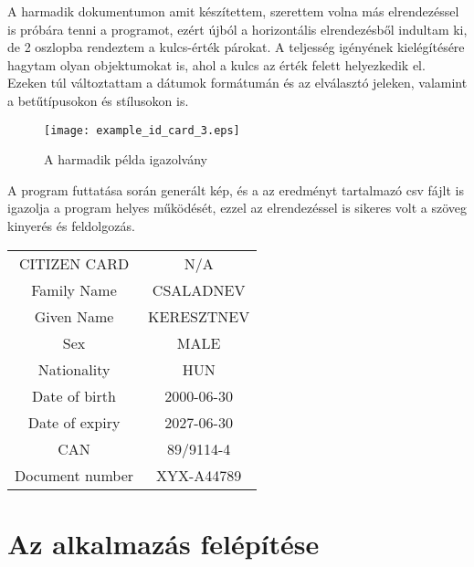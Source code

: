 \documentclass[12pt]{report}
\begin{document}
A harmadik dokumentumon amit készítettem, szerettem volna más elrendezéssel is próbára tenni a programot, ezért újból a horizontális elrendezésből indultam ki, de 2 oszlopba rendeztem a kulcs-érték párokat. A teljesség igényének kielégítésére hagytam olyan objektumokat is, ahol a kulcs az érték felett helyezkedik el. Ezeken túl változtattam a dátumok formátumán és az elválasztó jeleken, valamint a betűtípusokon és stílusokon is.

\begin{figure}[h]
    \centerline{\texttt{[image: example\_id\_card\_3.eps]}}
    \caption{A harmadik példa igazolvány}
\end{figure}

A program futtatása során generált kép, és a az eredményt tartalmazó csv fájlt is igazolja a program helyes működését, ezzel az elrendezéssel is sikeres volt a szöveg kinyerés és feldolgozás.

\begin{tcolorbox}
    \begin{center}
        \begin{tabular}{ c c }
            CITIZEN CARD & N/A \\ 
            Family Name & CSALADNEV \\ 
            Given Name & KERESZTNEV \\ 
            Sex & MALE \\ 
            Nationality & HUN \\ 
            Date of birth & 2000-06-30 \\ 
            Date of expiry & 2027-06-30 \\ 
            CAN & 89/9114-4 \\ 
            Document number & XYX-A44789 \\ 
        \end{tabular}
    \end{center}
\end{tcolorbox}

\section{Az alkalmazás felépítése}
\end{document}
